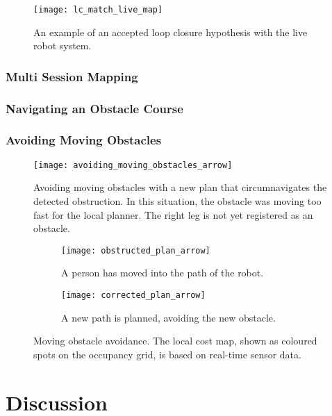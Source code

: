 \begin{figure}[p]
	\centering
	\texttt{[image: lc\_match\_live\_map]}
	\caption{An example of an accepted loop closure hypothesis with the live robot system.}
	\label{fig:lc_match_live_map}
\end{figure}

\subsubsection{Multi Session Mapping}

\subsubsection{Navigating an Obstacle Course}



\subsubsection{Avoiding Moving Obstacles}

\begin{figure}[p]
	\centering
	\texttt{[image: avoiding\_moving\_obstacles\_arrow]}
	\caption{Avoiding moving obstacles with a new plan that circumnavigates the detected obstruction. In this situation, the obstacle was moving too fast for the local planner. The right leg is not yet registered as an obstacle.}
	\label{fig:avoiding_moving_obstacles}
\end{figure}

\begin{figure}
	\centering
	\begin{subfigure}[b]{0.46\textwidth}
		\texttt{[image: obstructed\_plan\_arrow]}
		\caption{A person has moved into the path of the robot.}
		\label{fig:obstructed_plan}
	\end{subfigure}
	\begin{subfigure}[b]{0.472\textwidth}
		\texttt{[image: corrected\_plan\_arrow]}
		\caption{A new path is planned, avoiding the new obstacle.}
		\label{fig:corrected_plan}
	\end{subfigure}
	\caption{Moving obstacle avoidance. The local cost map, shown as coloured spots on the occupancy grid, is based on real-time sensor data. }
\end{figure}




\section{Discussion}